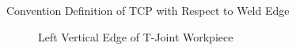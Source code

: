\begin{figure}[!htbp]
\begin{subfigure}[b]{0.4\textwidth}
		\caption{} 
		\label{fig:imgoridef2}
	\end{subfigure}	
	\caption{Convention Definition of TCP with Respect  to Weld Edge}  
	\label{fig:tcor}
\end{figure}

\begin{figure}[!htbp] %
	\centering
	\begin{subfigure}[b]{0.4\textwidth}	
		 \caption{Left Vertical Edge of T-Joint Workpiece}
		\label{fig:imguc1}
	\end{subfigure}
	\begin{subfigure}[b]{0.4\textwidth}		

\end{subfigure}
\end{figure}
